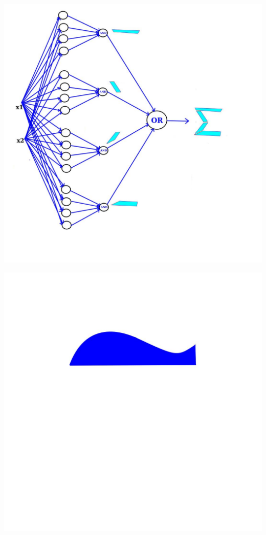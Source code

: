 \documentclass[12pt,aspectratio=169]{beamer}
\begin{document}
\begin{frame}
\begin{center}
\includegraphics[scale=0.35]{sigma3}
\end{center}
\end{frame}


\begin{frame}
\begin{center}
\includegraphics[scale=0.4]{nonlinear}
\end{center}
\end{frame}
\end{document}
